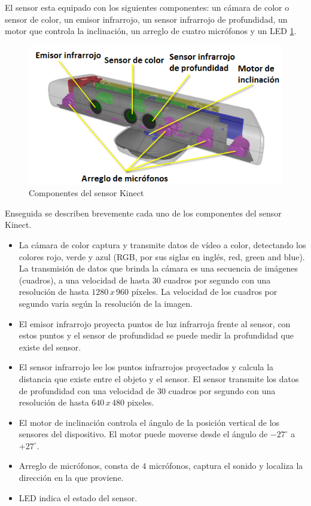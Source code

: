 El sensor esta equipado con los siguientes componentes: un cámara de color o sensor de color, un emisor infrarrojo, un sensor infrarrojo de profundidad, un motor que controla la inclinación, un arreglo de cuatro micrófonos y un LED \ref{fig:KinectComponentes}. 

\begin{figure}[!h]
\begin{center}
\includegraphics[scale=.6]{./Figures/sensor.png}
\end{center}
\caption{Componentes del sensor Kinect}
\label{fig:KinectComponentes}
\end{figure} 

Enseguida se describen brevemente cada uno de los componentes del sensor Kinect. 
\begin{itemize}
\item La cámara de color captura y transmite datos de vídeo a color, detectando los colores rojo, verde y azul (RGB, por sus siglas en ingl\'es, red, green and blue). La transmisión de datos que brinda la cámara es una secuencia de imágenes (cuadros), a una velocidad de hasta $30$ cuadros por segundo con una resolución de hasta $1280\, x \, 960$ p\'ixeles. La velocidad de los cuadros por segundo varia según la resolución de la imagen.  

\item El emisor infrarrojo proyecta puntos de luz infrarroja frente al sensor, con estos puntos y el sensor de profundidad se puede medir la profundidad que existe del sensor.

\item El sensor infrarrojo lee los puntos infrarrojos proyectados y calcula la distancia que existe entre el objeto y el sensor. El sensor transmite los datos de profundidad con una velocidad de $30$ cuadros por segundo con una resolución de hasta $640 \, x \, 480$ pixeles.   

\item El motor de inclinación controla el \'angulo de la posición vertical de los sensores del dispositivo. El motor puede moverse desde el \'angulo de $-27^ \circ$ a $+27^\circ$. 

\item Arreglo de micrófonos, consta de $4$ micrófonos, captura el sonido y localiza la dirección en la que proviene. 

\item LED indica el estado del sensor.
 
\end{itemize}


